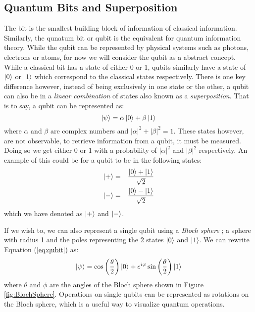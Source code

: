 \documentclass[reqno]{amsart}
\numberwithin{equation}{section}
\numberwithin{figure}{section}
\begin{document}
\subsection{Quantum Bits and Superposition} \label{sec:QubitsandSuperposition}
\begin{justify}
    The bit is the smallest building block of information of classical information. Similarly, the qunatum bit or qubit is the equivalent for quantum information theory. \cite{Aaronson2013} While the qubit can be represented by physical systems such as photons, electrons or atoms, for now we will consider the qubit as a abstract concept. \\

    While a classical bit has a state of either 0 or 1, qubits similarly have a state of $\ket{0}$ or $\ket{1}$ which correspond to the classical states respectively. There is one key difference however, instead of being exclusively in one state or the other, a qubit can also be in a \textit{linear combination} of states also known as a \textit{superposition}. That is to say, a qubit can be represented as:
    \begin{equation}
        \ket{\psi} = \alpha\ket{0} + \beta\ket{1} \label{eq:qubit}
    \end{equation}
where $\alpha$ and $\beta$ are complex numbers and $|\alpha|^{2} + |\beta|^{2} = 1$. These states however, are not observable, to retrieve information from a qubit, it must be measured. Doing so we get either 0 or 1 with a probability of $|\alpha|^{2}$ and $|\beta|^{2}$ respectively. An example of this could be for a qubit to be in the following states:
    \begin{eqnarray}
        \ket{+} &=& \frac{\ket{0} + \ket{1}}{\sqrt{2}} \label{eqn:+} \\
        \ket{-} &=& \frac{\ket{0} - \ket{1}}{\sqrt{2}} \label{eqn:-}
    \end{eqnarray}
which we have denoted as $\ket{+}$ and $\ket{-}$.

If we wish to, we can also represent a single qubit using a \textit{Bloch sphere} \cite{FeynmanRichardVernon1957}; a sphere with radius 1 and the poles representing the 2 states $\ket{0}$ and $\ket{1}$. We can rewrite Equation (\ref{eq:qubit}) as:
    \begin{equation}
        \ket{\psi} = \cos\left(\frac{\theta}{2}\right)\ket{0} + e^{i\varphi}\sin\left(\frac{\theta}{2}\right)\ket{1}
    \end{equation}
where $\theta$ and $\phi$ are the angles of the Bloch sphere shown in Figure \ref{fig:BlochSphere}. Operations on single qubits can be represented as rotations on the Bloch sphere, which is a useful way to visualize quantum operations. \\
    \begin{figure}[h]
        \centering
        \begin{tikzpicture}


\end{tikzpicture}
\end{figure}
\end{justify}
\end{document}
